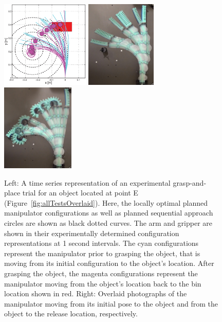 \begin{figure}[htbp]
\begin{centering}
  \includegraphics[width=0.375\textwidth]{Figures/experimental_results/oneTrialVsTime.eps}
\includegraphics[width=0.30\textwidth]{figures/experimental_results/exp5a-4_sweep_to_object.jpg}
\includegraphics[width=0.31\textwidth]{figures/experimental_results/exp5a-4_sweep_to_bin.jpg}
  \caption{Left: A time series representation of an experimental grasp-and-place trial for an object located at point E (Figure~\ref{fig:allTestsOverlaid}). Here, the locally optimal planned manipulator configurations as well as planned sequential approach circles are shown as black dotted curves. The arm and gripper are shown in their experimentally determined configuration representations at 1 second intervals. The cyan configurations represent the manipulator prior to grasping the object, that is moving from its initial configuration to the object's location.  After grasping the object, the magenta configurations represent the manipulator moving from the object's location back to the bin location shown in red.  Right: Overlaid photographs of the manipulator moving from its initial pose to the object and from the object to the release location, respectively.}
\label{fig:oneTrialVsTime}
\end{centering}
\end{figure}

